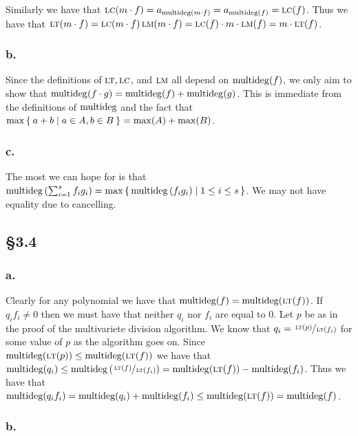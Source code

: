\documentclass[letterpaper]{article}
\begin{document}
Similarly we have that $\operatorname{\textsc{lc}}(m \cdot f) = a_{\operatorname{multideg}(m \cdot f)} = a_{\operatorname{multideg}(f)} = \operatorname{\textsc{lc}}(f)$.
Thus we have that $\operatorname{\textsc{lt}}(m \cdot f) = \operatorname{\textsc{lc}}(m \cdot f) \operatorname{\textsc{lm}}(m \cdot f) = \operatorname{\textsc{lc}}(f) \cdot m \cdot \operatorname{\textsc{lm}}(f) = m \cdot \operatorname{\textsc{lt}}(f)$.

\subsubsection*{b.}

Since the definitions of $\operatorname{\textsc{lt}}, \operatorname{\textsc{lc}}$, and $\operatorname{\textsc{lm}}$ all depend on $\operatorname{multideg}(f)$, we only aim to show that $\operatorname{multideg}(f \cdot g) = \operatorname{multideg}(f) + \operatorname{multideg}(g)$. This is immediate from the definitions of $\operatorname{multideg}$ and the fact that $\max\Set{a + b | a \in A, b \in B} = \max(A) + \max(B)$. 

\subsubsection*{c.}

The most we can hope for is that $\mdeg\pqty{\sum_{i = 1}^{s} f_{i} g_{i}} = \max\set{\mdeg\pqty{f_{i} g_{i}} | 1 \leq i \leq s}$. We may not have equality due to cancelling.

\clearpage

\subsection*{\S 3.4}

\subsubsection*{a.}

Clearly for any polynomial we have that $\operatorname{multideg}(f) = \operatorname{multideg}(\operatorname{\textsc{lt}}(f))$. If $q_{i} f_{i} \neq 0$ then we must have that neither $q_{i}$ nor $f_{i}$ are equal to $0$. Let $p$ be as in the proof of the multivariete division algorithm. We know that $q_{i} = \sfrac{\operatorname{\textsc{lt}}(p)}{\operatorname{\textsc{lt}}(f_{i})}$ for some value of $p$ as the algorithm goes on. Since $\operatorname{multideg}(\operatorname{\textsc{lt}}(p)) \leq \operatorname{multideg}(\operatorname{\textsc{lt}}(f))$ we have that $\mdeg(q_{i}) \leq \mdeg\pqty{\sfrac{\lt(f)}{\lt(f_{i})}} = \mdeg(\lt(f)) - \mdeg(f_{i})$. Thus we have that $\operatorname{multideg}(q_{i}f_{i}) = \operatorname{multideg}(q_{i}) + \operatorname{multideg}(f_{i}) \leq \operatorname{multideg}(\operatorname{\textsc{lt}}(f)) = \operatorname{multideg}(f)$.

\subsubsection*{b.}
\end{document}

